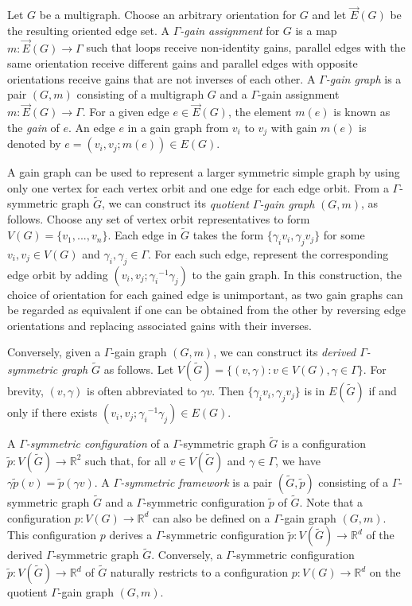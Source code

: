 \documentclass[reqno,a4paper,10pt]{article}
\theoremstyle{definition}
\theoremstyle{remark}
\numberwithin{equation}{section}
\numberwithin{figure}{section}
\numberwithin{table}{section}
\newcommand{\R}{\mathbb{R}}
\newcommand{\G}{\tilde{G}}
\newcommand{\p}{\tilde{p}}
\begin{document}
    Let $G$ be a multigraph. Choose an arbitrary orientation for $G$ and let $\vec{E}(G)$ be the resulting oriented edge set. A \emph{$\Gamma$-gain assignment} for $G$ is a map $m:\vec{E}(G)\to\Gamma$ such that loops receive non-identity gains, parallel edges with the same orientation receive different gains and parallel edges with opposite orientations receive gains that are not inverses of each other. A \emph{$\Gamma$-gain graph} is a pair $(G,m)$ consisting of a multigraph $G$ and a $\Gamma$-gain assignment $m:\vec{E}(G)\to\Gamma$. For a given edge $e\in \vec{E}(G)$, the element $m(e)$ is known as the \emph{gain} of $e$. An edge $e$ in a gain graph from $v_i$ to $v_j$ with gain $m(e)$ is denoted by $e=(v_i,v_j;m(e))\in E(G)$.

    A gain graph can be used to represent a larger symmetric simple graph  by using only one vertex for each vertex orbit and one edge for each edge orbit. From a $\Gamma$-symmetric graph $\G$, we can construct its \emph{quotient $\Gamma$-gain graph} $(G,m)$, as follows. Choose any set of vertex orbit representatives to form $V(G)=\{v_1,...,v_n\}$. Each edge in $\G$ takes the form $\{\gamma_iv_i,\gamma_jv_j\}$ for some $v_i,v_j\in V(G)$ and $\gamma_i,\gamma_j\in\Gamma$. For each such edge, represent the corresponding edge orbit by adding $(v_i,v_j;{\gamma_i}^{-1}\gamma_j)$ to the gain graph. In this construction, the choice of orientation for each gained edge is unimportant, as two gain graphs can be regarded as equivalent if one can be obtained from the other by reversing edge orientations and replacing associated gains with their inverses.

    Conversely, given a $\Gamma$-gain graph $(G,m)$, we can construct its \emph{derived $\Gamma$-symmetric graph} $\G$ as follows. Let $V(\G)=\{(v,\gamma):v\in V(G),\gamma\in\Gamma\}$. For brevity, $(v,\gamma)$ is often abbreviated to $\gamma v$. Then $\{\gamma_iv_i,\gamma_jv_j\}$ is in $E(\G)$ if and only if there exists $(v_i,v_j;{\gamma_i}^{-1}\gamma_j)\in E(G)$.
    
    A \emph{$\Gamma$-symmetric configuration} of a $\Gamma$-symmetric graph $\G$ is a configuration $\p:V(\G)\to\R^2$ such that, for all $v\in V(\G)$ and $\gamma\in\Gamma$, we have $\gamma\p(v)=\p(\gamma v)$. A \emph{$\Gamma$-symmetric framework} is a pair $(\G,\p)$ consisting of a $\Gamma$-symmetric graph $\G$ and a $\Gamma$-symmetric configuration $\p$ of $\G$. Note that a configuration $p:V(G)\to\R^d$ can also be defined on a $\Gamma$-gain graph $(G,m)$. This configuration $p$ derives a $\Gamma$-symmetric configuration $\p:V(\G)\to\R^d$ of the derived $\Gamma$-symmetric graph $\G$. Conversely,  a $\Gamma$-symmetric configuration $\p:V(\G)\to\R^d$ of $\G$  naturally  restricts to a  configuration $p:V(G)\to\R^d$ on the quotient $\Gamma$-gain graph $(G,m)$.
\end{document}
